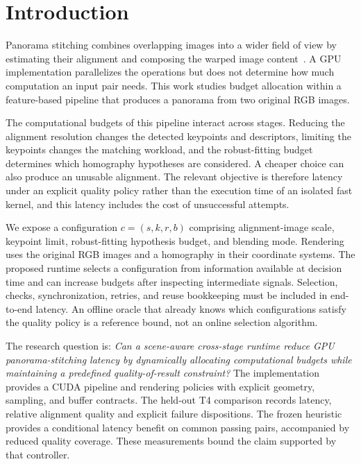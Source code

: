 \section{Introduction}
\label{sec:introduction}
Panorama stitching combines overlapping images into a wider field of view by
estimating their alignment and composing the warped image
content~\cite{brown2007stitching}. A GPU implementation parallelizes the
operations but does not determine how much computation an input pair needs. This work
studies budget allocation within a feature-based pipeline that produces a
panorama from two original RGB images.

The computational budgets of this pipeline interact across stages. Reducing the
alignment resolution changes the detected keypoints and descriptors, limiting
the keypoints changes the matching workload, and the robust-fitting budget
determines which homography hypotheses are considered. A cheaper choice can also
produce an unusable alignment. The relevant objective is therefore latency under
an explicit quality policy rather than the execution time of an isolated fast
kernel, and this latency includes the cost of unsuccessful attempts.

We expose a configuration $c=(s,k,r,b)$ comprising alignment-image scale,
keypoint limit, robust-fitting hypothesis budget, and blending mode. Rendering
uses the original RGB images and a homography in their coordinate systems.
The proposed runtime selects a configuration from information available at
decision time and can increase budgets after inspecting intermediate signals.
Selection, checks, synchronization, retries, and reuse bookkeeping must be
included in end-to-end latency. An offline oracle that already knows which
configurations satisfy the quality policy is a reference bound, not an online
selection algorithm.

The research question is: \emph{Can a scene-aware cross-stage runtime reduce GPU
panorama-stitching latency by dynamically allocating computational budgets while
maintaining a predefined quality-of-result constraint?} The implementation
provides a CUDA pipeline and rendering policies with explicit geometry, sampling,
and buffer contracts. The held-out T4 comparison records latency, relative
alignment quality and explicit failure dispositions. The frozen heuristic
provides a conditional latency benefit on common passing pairs, accompanied
by reduced quality coverage. These measurements bound the claim supported
by that controller.

